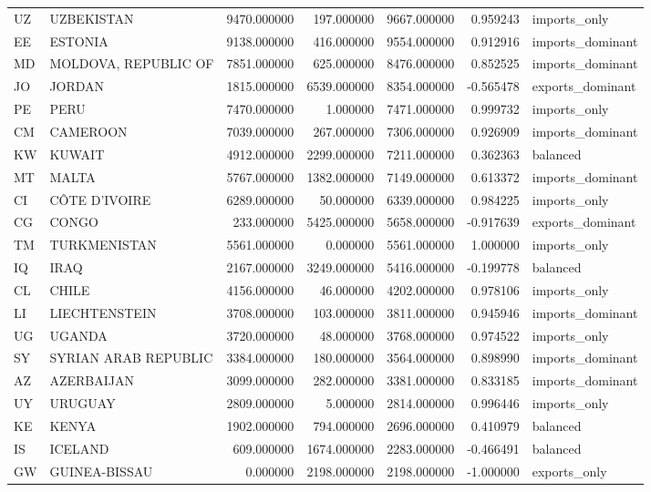 \begin{tabular}{llrrrrl}
UZ & UZBEKISTAN & 9470.000000 & 197.000000 & 9667.000000 & 0.959243 & imports\_only \\
EE & ESTONIA & 9138.000000 & 416.000000 & 9554.000000 & 0.912916 & imports\_dominant \\
MD & MOLDOVA, REPUBLIC OF & 7851.000000 & 625.000000 & 8476.000000 & 0.852525 & imports\_dominant \\
JO & JORDAN & 1815.000000 & 6539.000000 & 8354.000000 & -0.565478 & exports\_dominant \\
PE & PERU & 7470.000000 & 1.000000 & 7471.000000 & 0.999732 & imports\_only \\
CM & CAMEROON & 7039.000000 & 267.000000 & 7306.000000 & 0.926909 & imports\_dominant \\
KW & KUWAIT & 4912.000000 & 2299.000000 & 7211.000000 & 0.362363 & balanced \\
MT & MALTA & 5767.000000 & 1382.000000 & 7149.000000 & 0.613372 & imports\_dominant \\
CI & CÔTE D'IVOIRE & 6289.000000 & 50.000000 & 6339.000000 & 0.984225 & imports\_only \\
CG & CONGO & 233.000000 & 5425.000000 & 5658.000000 & -0.917639 & exports\_dominant \\
TM & TURKMENISTAN & 5561.000000 & 0.000000 & 5561.000000 & 1.000000 & imports\_only \\
IQ & IRAQ & 2167.000000 & 3249.000000 & 5416.000000 & -0.199778 & balanced \\
CL & CHILE & 4156.000000 & 46.000000 & 4202.000000 & 0.978106 & imports\_only \\
LI & LIECHTENSTEIN & 3708.000000 & 103.000000 & 3811.000000 & 0.945946 & imports\_dominant \\
UG & UGANDA & 3720.000000 & 48.000000 & 3768.000000 & 0.974522 & imports\_only \\
SY & SYRIAN ARAB REPUBLIC & 3384.000000 & 180.000000 & 3564.000000 & 0.898990 & imports\_dominant \\
AZ & AZERBAIJAN & 3099.000000 & 282.000000 & 3381.000000 & 0.833185 & imports\_dominant \\
UY & URUGUAY & 2809.000000 & 5.000000 & 2814.000000 & 0.996446 & imports\_only \\
KE & KENYA & 1902.000000 & 794.000000 & 2696.000000 & 0.410979 & balanced \\
IS & ICELAND & 609.000000 & 1674.000000 & 2283.000000 & -0.466491 & balanced \\
GW & GUINEA-BISSAU & 0.000000 & 2198.000000 & 2198.000000 & -1.000000 & exports\_only \\

\end{tabular}
